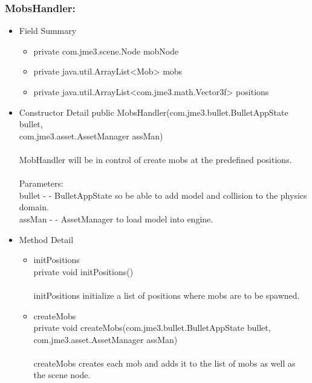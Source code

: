 \documentclass[letterpaper]{article}
\begin{document}
				\vspace{0.2in}
				\subsubsection*{MobsHandler:}
				\vspace{0.1in}
					\begin{itemize}
						\item	Field Summary
								\begin{itemize}
									\item	private com.jme3.scene.Node	mobNode 
									\item	private java.util.ArrayList<Mob>	mobs 
									\item	private java.util.ArrayList<com.jme3.math.Vector3f>	positions
								\end{itemize}
						\item	Constructor Detail
								public MobsHandler(com.jme3.bullet.BulletAppState bullet, \\
          com.jme3.asset.AssetManager assMan) \\ \\
								MobHandler will be in control of create mobs at the predefined positions. \\ \\
								Parameters: \\
								bullet - - BulletAppState so be able to add model and collision to the physics domain. \\
								assMan - - AssetManager to load model into engine.
						\item	Method Detail
								\begin{itemize}
									\item	initPositions \\
											private void initPositions() \\ \\
											initPositions initialize a list of positions where mobs are to be spawned.
									\item	createMobs \\
											private void createMobs(com.jme3.bullet.BulletAppState bullet, \\
		              com.jme3.asset.AssetManager assMan) \\ \\
											createMobs creates each mob and adds it to the list of mobs as well as the scene node. \\ \\

\end{itemize}
\end{itemize}
\end{document}
